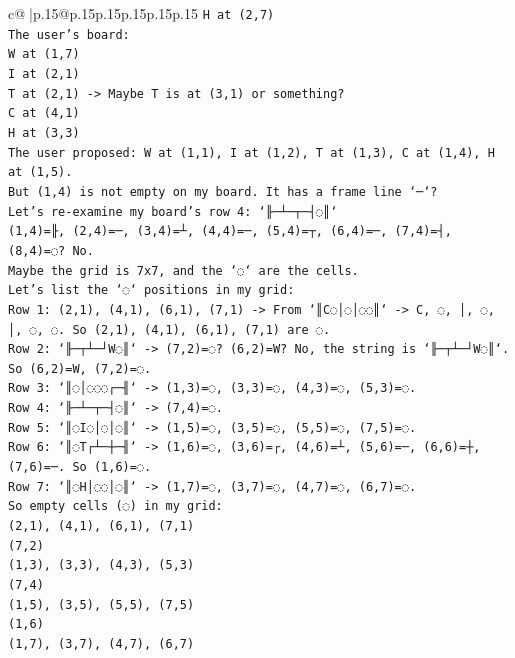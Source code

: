 \documentclass{article}
\begin{document}
{\begin{supertabular}{c@{$\;$}|p{.15\linewidth}@{}p{.15\linewidth}p{.15\linewidth}p{.15\linewidth}p{.15\linewidth}p{.15\linewidth}}
{{{\texttt{H at (2,7)} \\
\texttt{The user's board:} \\
\texttt{W at (1,7)} \\
\texttt{I at (2,1)} \\
\texttt{T at (2,1) {-}> Maybe T is at (3,1) or something?} \\
\texttt{C at (4,1)} \\
\texttt{H at (3,3)} \\
\texttt{The user proposed: W at (1,1), I at (1,2), T at (1,3), C at (1,4), H at (1,5).} \\
\texttt{But (1,4) is not empty on my board. It has a frame line `─`?} \\
\texttt{Let's re{-}examine my board's row 4: `╟─┴─┬─┤◌║`} \\
\texttt{(1,4)=╟, (2,4)=─, (3,4)=┴, (4,4)=─, (5,4)=┬, (6,4)=─, (7,4)=┤, (8,4)=◌? No.} \\
\texttt{Maybe the grid is 7x7, and the `◌` are the cells.} \\
\texttt{Let's list the `◌` positions in my grid:} \\
\texttt{Row 1: (2,1), (4,1), (6,1), (7,1) {-}> From `║C◌│◌│◌◌║` {-}> C, ◌, │, ◌, │, ◌, ◌. So (2,1), (4,1), (6,1), (7,1) are ◌.} \\
\texttt{Row 2: `╟─┬┴─┘W◌║` {-}> (7,2)=◌? (6,2)=W? No, the string is `╟─┬┴─┘W◌║`. So (6,2)=W, (7,2)=◌.} \\
\texttt{Row 3: `║◌│◌◌◌┌─╢` {-}> (1,3)=◌, (3,3)=◌, (4,3)=◌, (5,3)=◌.} \\
\texttt{Row 4: `╟─┴─┬─┤◌║` {-}> (7,4)=◌.} \\
\texttt{Row 5: `║◌I◌│◌│◌║` {-}> (1,5)=◌, (3,5)=◌, (5,5)=◌, (7,5)=◌.} \\
\texttt{Row 6: `║◌T┌┴─┼─╢` {-}> (1,6)=◌, (3,6)=┌, (4,6)=┴, (5,6)=─, (6,6)=┼, (7,6)=─. So (1,6)=◌.} \\
\texttt{Row 7: `║◌H│◌◌│◌║` {-}> (1,7)=◌, (3,7)=◌, (4,7)=◌, (6,7)=◌.} \\
\texttt{So empty cells (◌) in my grid:} \\
\texttt{(2,1), (4,1), (6,1), (7,1)} \\
\texttt{(7,2)} \\
\texttt{(1,3), (3,3), (4,3), (5,3)} \\
\texttt{(7,4)} \\
\texttt{(1,5), (3,5), (5,5), (7,5)} \\
\texttt{(1,6)} \\
\texttt{(1,7), (3,7), (4,7), (6,7)} \\
}}}
\end{supertabular}}
\end{document}
